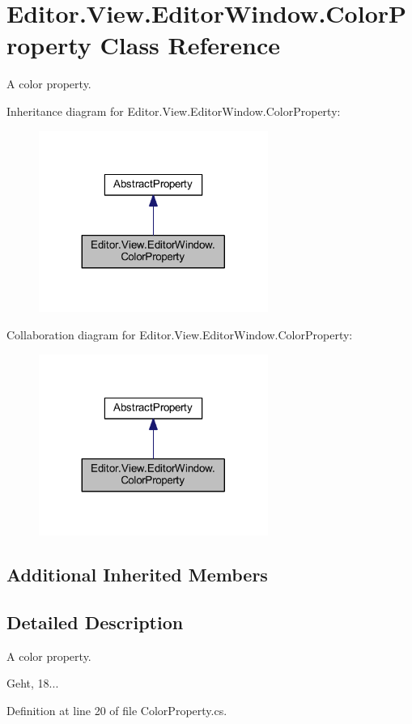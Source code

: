 \section{Editor.\-View.\-Editor\-Window.\-Color\-Property Class Reference}
\label{class_editor_1_1_view_1_1_editor_window_1_1_color_property}


A color property.  




Inheritance diagram for Editor.\-View.\-Editor\-Window.\-Color\-Property\-:
\nopagebreak
\begin{figure}[H]
\begin{center}
\leavevmode
\includegraphics[width=212pt]{class_editor_1_1_view_1_1_editor_window_1_1_color_property__inherit__graph}
\end{center}
\end{figure}


Collaboration diagram for Editor.\-View.\-Editor\-Window.\-Color\-Property\-:
\nopagebreak
\begin{figure}[H]
\begin{center}
\leavevmode
\includegraphics[width=212pt]{class_editor_1_1_view_1_1_editor_window_1_1_color_property__coll__graph}
\end{center}
\end{figure}
\subsection*{Additional Inherited Members}


\subsection{Detailed Description}
A color property. 

Geht, 18... 

Definition at line 20 of file Color\-Property.\-cs.

